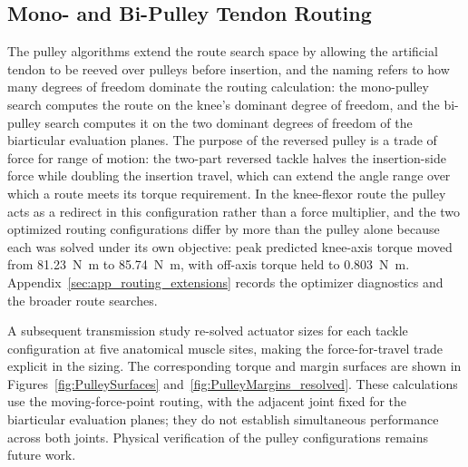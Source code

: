 \subsection{Mono- and Bi-Pulley Tendon Routing}\label{sec:disc_pulley}

The pulley algorithms extend the route search space by allowing the artificial tendon to be reeved over pulleys before insertion, and the naming refers to how many degrees of freedom dominate the routing calculation: the mono-pulley search computes the route on the knee's dominant degree of freedom, and the bi-pulley search computes it on the two dominant degrees of freedom of the biarticular evaluation planes. The purpose of the reversed pulley is a trade of force for range of motion: the two-part reversed tackle halves the insertion-side force while doubling the insertion travel, which can extend the angle range over which a route meets its torque requirement. In the knee-flexor route the pulley acts as a redirect in this configuration rather than a force multiplier, and the two optimized routing configurations differ by more than the pulley alone because each was solved under its own objective: peak predicted knee-axis torque moved from \qty{81.23}{\newton\meter} to \qty{85.74}{\newton\meter}, with off-axis torque held to \qty{0.803}{\newton\meter}. Appendix~\ref{sec:app_routing_extensions} records the optimizer diagnostics and the broader route searches.

A subsequent transmission study re-solved actuator sizes for each tackle configuration at five anatomical muscle sites, making the force-for-travel trade explicit in the sizing. The corresponding torque and margin surfaces are shown in Figures~\ref{fig:PulleySurfaces} and~\ref{fig:PulleyMargins_resolved}. These calculations use the moving-force-point routing, with the adjacent joint fixed for the biarticular evaluation planes; they do not establish simultaneous performance across both joints. Physical verification of the pulley configurations remains future work.
